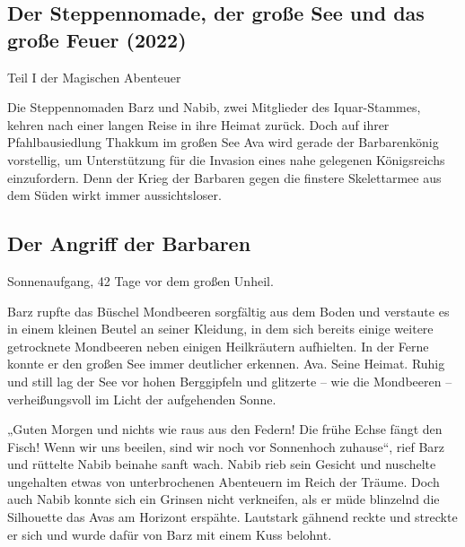 \begin{chapterbox}
    \chapter{Der Steppennomade, der große See und das große Feuer (2022)}
    \label{Der Steppennomade, der große See und das große Feuer (2022)}

    \begin{center}
        Teil I der Magischen Abenteuer
    \end{center}
    
    Die Steppennomaden Barz und Nabib, zwei Mitglieder des Iquar-Stammes, kehren nach einer langen Reise in ihre Heimat zurück. Doch auf ihrer Pfahlbausiedlung Thakkum im großen See Ava wird gerade der Barbarenkönig vorstellig, um Unterstützung für die Invasion eines nahe gelegenen Königsreichs einzufordern. Denn der Krieg der Barbaren gegen die finstere Skelettarmee aus dem Süden wirkt immer aussichtsloser.
\end{chapterbox}






\section{Der Angriff der Barbaren}




Sonnenaufgang, 42 Tage vor dem großen Unheil.\bigskip



Barz rupfte das Büschel Mondbeeren sorgfältig aus dem Boden und verstaute es in einem kleinen Beutel an seiner Kleidung, in dem sich bereits einige weitere getrocknete Mondbeeren neben einigen Heilkräutern aufhielten. In der Ferne konnte er den großen See immer deutlicher erkennen. Ava. Seine Heimat. Ruhig und still lag der See vor hohen Berggipfeln und glitzerte – wie die Mondbeeren – verheißungsvoll im Licht der aufgehenden Sonne.

„Guten Morgen und nichts wie raus aus den Federn! Die frühe Echse fängt den Fisch! Wenn wir uns beeilen, sind wir noch vor Sonnenhoch zuhause“, rief Barz und rüttelte Nabib beinahe sanft wach. Nabib rieb sein Gesicht und nuschelte ungehalten etwas von unterbrochenen Abenteuern im Reich der Träume. Doch auch Nabib konnte sich ein Grinsen nicht verkneifen, als er müde blinzelnd die Silhouette das Avas am Horizont erspähte. Lautstark gähnend reckte und streckte er sich und wurde dafür von Barz mit einem Kuss belohnt.

